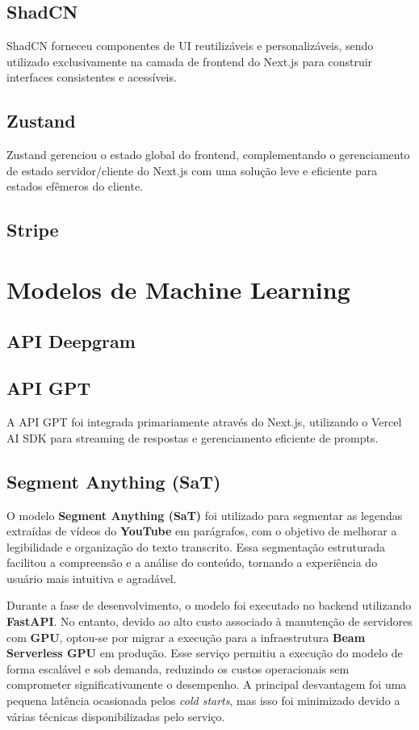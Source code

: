 \documentclass[tcc,capa]{texufpel}
\begin{document}
\subsection{ShadCN}
ShadCN forneceu componentes de UI reutilizáveis e personalizáveis, sendo utilizado exclusivamente na camada de frontend do Next.js para construir interfaces consistentes e acessíveis.

\subsection{Zustand}
Zustand gerenciou o estado global do frontend, complementando o gerenciamento de estado servidor/cliente do Next.js com uma solução leve e eficiente para estados efêmeros do cliente.


\subsection{Stripe}

\section{Modelos de Machine Learning}


\subsection{API Deepgram}

\subsection{API GPT}
A API GPT foi integrada primariamente através do Next.js, utilizando o Vercel AI SDK para streaming de respostas e gerenciamento eficiente de prompts.

\subsection{Segment Anything (SaT)}

O modelo \textbf{Segment Anything (SaT)} foi utilizado para segmentar as legendas extraídas de vídeos do \textbf{YouTube} em parágrafos, com o objetivo de melhorar a legibilidade e organização do texto transcrito. Essa segmentação estruturada facilitou a compreensão e a análise do conteúdo, tornando a experiência do usuário mais intuitiva e agradável.

Durante a fase de desenvolvimento, o modelo foi executado no backend utilizando \textbf{FastAPI}. No entanto, devido ao alto custo associado à manutenção de servidores com \textbf{GPU}, optou-se por migrar a execução para a infraestrutura \textbf{Beam Serverless GPU} em produção. Esse serviço permitiu a execução do modelo de forma escalável e sob demanda, reduzindo os custos operacionais sem comprometer significativamente o desempenho. A principal desvantagem foi uma pequena latência ocasionada pelos \textit{cold starts}, mas isso foi minimizado devido a várias técnicas disponibilizadas pelo serviço.
\end{document}
